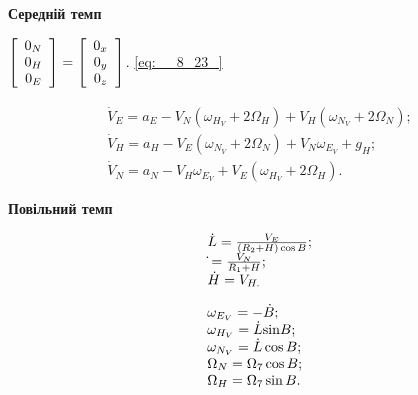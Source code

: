 \textbf{Середній темп}

$\left[\begin{array}{c} {0_{N} } \\ {0_{H} } \\ {0_{E} } \end{array}\right]=
\left[\begin{array}{c} {0_{x_{{\rm }} } } \\ {0_{y_{{\rm }} } } \\ {0_{z_{{\rm }} 
} } \end{array}\right]$.                                                    \eqref{eq:__8_23_} 



\begin{equation} 
\label{eq:__8_24_} \begin{array}{l} {\dot{V}_{E} =a_{E} -V_{N} (\omega_{H_{V} 
} +2\Omega_{H} )+V_{H} (\omega_{N_{V} } +2\Omega_{N} );} \\ {\dot{V}_{H} =a_{H} 
-V_{E} (\omega_{N_{V} } +2\Omega_{N} )+V_{N} \omega_{E_{V} } +g_{H} ;} \\ {\dot{V}_{N} 
=a_{N} -V_{H} \omega_{E_{V} } +V_{E} (\omega_{H_{V} } +2\Omega_{H} ).} \end{array} \end{equation} 


\textbf{Повільний темп}

\begin{equation} \label{eq:__8_25_} \begin{array}{l} {\dot{L}=\frac{V_{E} }{(R_{{
\rm 2}} +H)\cos B} ;} \\ {\dot{}=\frac{V_{N} }{R_{1} +H} ;} \\ {\dot{H}=V_{H.} 
} \end{array} 
\end{equation} 



\begin{equation} \label{eq:__8_26_} \begin{array}{l} {\omega_{E_{V} } =-\dot{B};} 
\\ {\omega_{H_{V}} =\dot{L}{\rm sin}B;} \\ {\omega_{N_{V} } =\dot{L}\cos B;} \\ 
{\Omega_{N} =\Omega_{{\rm 7}} \cos B;\, \, \, \, } \\ {\Omega_{H} =\Omega_{{
\rm 7}} \sin B.} \end{array} 
\end{equation} 

  

